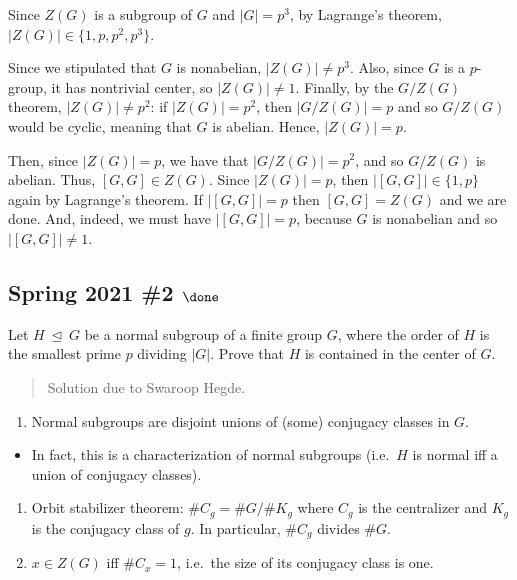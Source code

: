 \begin{solution}

Since \(Z(G)\) is a subgroup of \(G\) and \(|G| = p^3\), by Lagrange's
theorem, \(|Z(G)| \in \{1, p, p^2, p^3\}\).

Since we stipulated that \(G\) is nonabelian, \(|Z(G)| \ne p^3\). Also,
since \(G\) is a \(p\)-group, it has nontrivial center, so
\(|Z(G)| \ne 1\). Finally, by the \(G/Z(G)\) theorem,
\(|Z(G)| \ne p^2\): if \(|Z(G)| = p^2\), then \(|G/Z(G)| = p\) and so
\(G/Z(G)\) would be cyclic, meaning that \(G\) is abelian. Hence,
\(|Z(G)| = p\).

Then, since \(|Z(G)| = p\), we have that \(|G/Z(G)| = p^2\), and so
\(G/Z(G)\) is abelian. Thus, \([G, G] \in Z(G)\). Since \(|Z(G)| = p\),
then \(|[G,G]| \in \{ 1, p\}\) again by Lagrange's theorem. If
\(|[G,G]| = p\) then \([G,G] = Z(G)\) and we are done. And, indeed, we
must have \(|[G,G]| = p\), because \(G\) is nonabelian and so
\(|[G,G]| \ne 1\).

\end{solution}

\hypertarget{spring-2021-2-done}{%
\subsection{\texorpdfstring{Spring 2021 \#2
\(\done\)}{Spring 2021 \#2 \textbackslash done}}\label{spring-2021-2-done}}

Let \(H {~\trianglelefteq~}G\) be a normal subgroup of a finite group
\(G\), where the order of \(H\) is the smallest prime \(p\) dividing
\({\left\lvert {G} \right\rvert}\). Prove that \(H\) is contained in the
center of \(G\).

\begin{quote}
Solution due to Swaroop Hegde.
\end{quote}

\begin{concept}

\envlist

\begin{enumerate}
\def\labelenumi{\arabic{enumi}.}
\tightlist
\item
  Normal subgroups are disjoint unions of (some) conjugacy classes in
  \(G\).
\end{enumerate}

\begin{itemize}
\tightlist
\item
  In fact, this is a characterization of normal subgroups (i.e.~\(H\) is
  normal iff a union of conjugacy classes).
\end{itemize}

\begin{enumerate}
\def\labelenumi{\arabic{enumi}.}
\setcounter{enumi}{1}
\tightlist
\item
  Orbit stabilizer theorem: \(\# C_g = \# G/ \# K_g\) where \(C_g\) is
  the centralizer and \(K_g\) is the conjugacy class of \(g\). In
  particular, \(\# C_g\) divides \(\#G\).
\item
  \(x\in Z(G)\) iff \(\# C_x = 1\), i.e.~the size of its conjugacy class
  is one.
\end{enumerate}

\end{concept}

